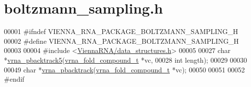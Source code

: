 \hypertarget{boltzmann__sampling_8h_source}{}\section{boltzmann\+\_\+sampling.\+h}
\label{boltzmann__sampling_8h_source}

\begin{DoxyCode}
00001 \textcolor{preprocessor}{#ifndef VIENNA\_RNA\_PACKAGE\_BOLTZMANN\_SAMPLING\_H}
00002 \textcolor{preprocessor}{#define VIENNA\_RNA\_PACKAGE\_BOLTZMANN\_SAMPLING\_H}
00003 
00004 \textcolor{preprocessor}{#include <\hyperlink{data__structures_8h}{ViennaRNA/data\_structures.h}>}
00005 
00027 \textcolor{keywordtype}{char} *\hyperlink{group__subopt__stochbt_ga347375a4da8bdff74639529847f97d4f}{vrna\_pbacktrack5}(\hyperlink{group__fold__compound_structvrna__fc__s}{vrna\_fold\_compound\_t} *vc,
00028                        \textcolor{keywordtype}{int}                  length);
00029 
00030 
00049 \textcolor{keywordtype}{char} *\hyperlink{group__subopt__stochbt_ga901fe42a33b07be083421741bf7dc610}{vrna\_pbacktrack}(\hyperlink{group__fold__compound_structvrna__fc__s}{vrna\_fold\_compound\_t} *vc);
00050 
00051 
00052 \textcolor{preprocessor}{#endif}
\end{DoxyCode}
